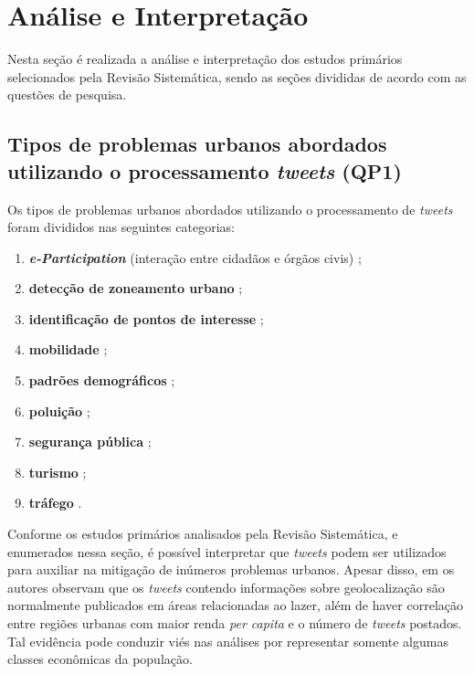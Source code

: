 \documentclass[
	12pt,				%
	oneside,			%
	a4paper,			%
	english,			%
	brazil				%
	]{abntex2ppgsi}
\begin{document}
{{\section{Análise e Interpretação}
\label{analise}
Nesta seção é realizada a análise e interpretação dos estudos primários selecionados pela Revisão Sistemática, sendo as seções divididas de acordo com as questões de pesquisa.
\subsection{Tipos de problemas urbanos abordados utilizando o processamento \textit{tweets} (QP1)}

Os tipos de problemas urbanos abordados utilizando o processamento de \textit{tweets} foram divididos nas seguintes categorias: 

\begin{enumerate}
\item \textit{\textbf{e-Participation}} (interação entre  cidadãos  e órgãos civis) \cite{Mukherjee2015, Soomro2016};
\item \textbf{detecção de zoneamento urbano} \cite{Frias-Martinez2014};
\item \textbf{identificação de pontos de interesse} \cite{Farseev2015, Gutev2016, Bendler2014, Abbasi2015, Gkiotsalitis2015, Gkiotsalitis2016, Hasan2014, Maghrebi2015, DiLorenzo2013};
\item \textbf{mobilidade} \cite{Gutev2016, Chen2016, Yousaf2014};
\item \textbf{padrões demográficos} \cite{Farseev2015, Gutev2016, Steiger2015Census, Guo2016};
\item \textbf{poluição} \cite{Zagal2016};
\item \textbf{segurança pública} \cite{Wen2016, Mata2015};
\item \textbf{turismo} \cite{Thomaz2016, Abbasi2015, Chua2016, Sobolevsky2015};
\item \textbf{tráfego} \cite{Anantharam2015, Lecue2014}.
\end{enumerate}

Conforme os estudos primários analisados pela Revisão Sistemática, e enumerados nessa seção, é possível interpretar que \textit{tweets} podem ser utilizados para auxiliar na mitigação de inúmeros problemas urbanos. Apesar disso, em \cite{Chaniotakis2015} os autores observam que os \textit{tweets} contendo informações sobre geolocalização são normalmente publicados em áreas relacionadas ao lazer, além de haver correlação entre regiões urbanas com maior renda \textit{per capita} e o número de \textit{tweets} postados. Tal evidência pode conduzir viés nas análises por representar somente algumas classes econômicas da população. 

}}
\end{document}
